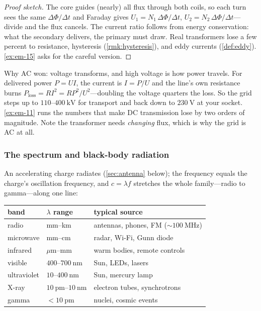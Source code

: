 \begin{proof}[Proof sketch]
The core guides (nearly) all flux through both coils, so each turn sees the same $\Delta\Phi/\Delta t$ and Faraday gives $U_1 = N_1\,\Delta\Phi/\Delta t$, $U_2 = N_2\,\Delta\Phi/\Delta t$---divide and the flux cancels. The current ratio follows from energy conservation: what the secondary delivers, the primary must draw. Real transformers lose a few percent to resistance, hysteresis (\cref{rmk:hysteresis}), and eddy currents (\cref{def:eddy}). \cref{ex:em-15} asks for the careful version. \qedhere
\end{proof}

Why AC won: voltage transforms, and high voltage is how power travels. For delivered power $P = UI$, the current is $I = P/U$ and the line's own resistance burns $P_\text{loss} = RI^2 = RP^2/U^2$---doubling the voltage quarters the loss. So the grid steps up to $110$--$400\ \mathrm{kV}$ for transport and back down to $230\ \mathrm{V}$ at your socket. \cref{ex:em-11} runs the numbers that make DC transmission lose by two orders of magnitude. Note the transformer needs \emph{changing} flux, which is why the grid is AC at all.

\subsubsection{The spectrum and black-body radiation}

An accelerating charge radiates (\cref{sec:antenna} below); the frequency equals the charge's oscillation frequency, and $c = \lambda f$ stretches the whole family---radio to gamma---along one line:

\begin{center}
\begin{tabular}{l|l|l}
band & $\lambda$ range & typical source \\ \hline
radio & mm--km & antennas, phones, FM ($\sim 100\ \mathrm{MHz}$) \\
microwave & mm--cm & radar, Wi-Fi, Gunn diode \\
infrared & $\mu$m--mm & warm bodies, remote controls \\
visible & $400$--$700\ \mathrm{nm}$ & Sun, LEDs, lasers \\
ultraviolet & $10$--$400\ \mathrm{nm}$ & Sun, mercury lamp \\
X-ray & $10\ \mathrm{pm}$--$10\ \mathrm{nm}$ & electron tubes, synchrotrons \\
gamma & $< 10\ \mathrm{pm}$ & nuclei, cosmic events \\
\end{tabular}
\end{center}

